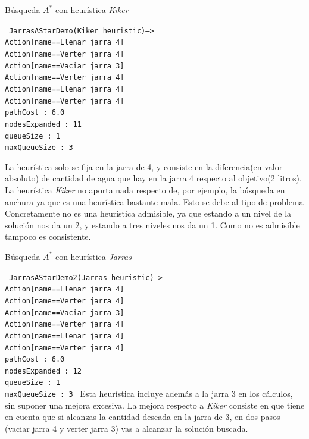 \documentclass[11pt, a4paper, spanish, openright, twoside]{book}
\begin{document}
\begin{section}{Búsqueda $A^*$ con heurística \textit{Kiker}}

\texttt{
	JarrasAStarDemo(Kiker heuristic)-->	\\
	Action[name==Llenar jarra 4]		\\
	Action[name==Verter jarra 4]		\\
	Action[name==Vaciar jarra 3]		\\
	Action[name==Verter jarra 4]		\\
	Action[name==Llenar jarra 4]		\\
	Action[name==Verter jarra 4]		\\
	pathCost : 6.0					\\
	nodesExpanded : 11			\\
	queueSize : 1					\\
	maxQueueSize : 3				
}

La heurística solo se fija en la jarra de 4, y consiste en la diferencia(en valor absoluto)  de cantidad de agua que hay en la jarra 4 respecto al objetivo(2 litros).
La heurística  \textit{Kiker} no aporta nada respecto de, por ejemplo, la búsqueda en anchura ya que es una heurística bastante mala. Esto se debe al tipo de problema Concretamente no es 
una heurística admisible, ya que estando a un nivel de la solución nos da un 2, y estando a tres niveles nos da un 1. Como no es admisible tampoco es consistente.


\end{section}
\begin{section}{Búsqueda $A^*$ con heurística \textit{Jarras}}

\texttt{
	JarrasAStarDemo2(Jarras heuristic)-->	\\
	Action[name==Llenar jarra 4]		\\
	Action[name==Verter jarra 4]		\\
	Action[name==Vaciar jarra 3]		\\
	Action[name==Verter jarra 4]		\\
	Action[name==Llenar jarra 4]		\\
	Action[name==Verter jarra 4]		\\
	pathCost : 6.0					\\
	nodesExpanded : 12			\\
	queueSize : 1					\\
	maxQueueSize : 3				
}
Esta heurística incluye además a la jarra 3 en los cálculos, sin suponer una mejora excesiva. La mejora respecto a \textit{Kiker} consiste en que tiene en cuenta que si alcanzas la cantidad 
deseada en la jarra de 3, en dos pasos (vaciar jarra 4 y verter jarra 3) vas a alcanzar la solución buscada.

\end{section}
\end{document}
